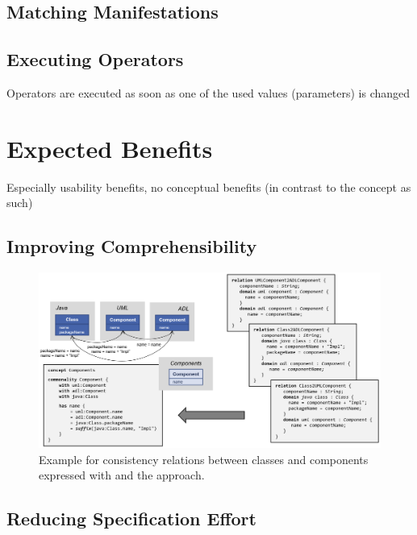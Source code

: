 \subsection{Matching Manifestations}

\subsection{Executing Operators}

Operators are executed as soon as one of the used values (parameters) is changed


\section{Expected Benefits}

Especially usability benefits, no conceptual benefits (in contrast to the concept as such)

\subsection{Improving Comprehensibility}

\begin{figure}
    \centering
    \includegraphics[width=\textwidth]{figures/quality/language/benefit_comprehensibility.png}
    \caption[Benefit of \commonalities regarding comprehensibility]{Example for consistency relations between classes and components expressed with \qvtr and the \commonalities approach.}
    \label{fig:language:benefit_comprehensibility}
\end{figure}

\subsection{Reducing Specification Effort}

